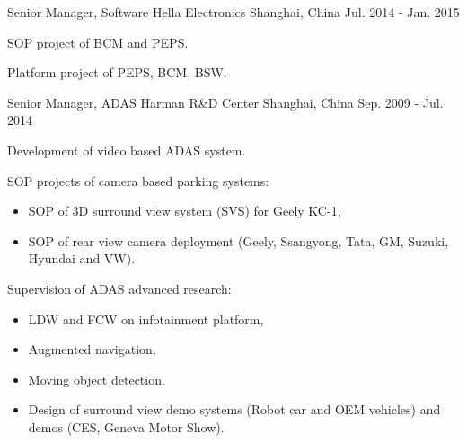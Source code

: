 \documentclass[../cv.tex]{subfiles}
\begin{document}
\begin{cventries}
  \cventry
    {Senior Manager, Software} %
    {Hella Electronics} %
    {Shanghai, China} %
    {Jul. 2014 - Jan. 2015} %
    {
      \begin{cvitems}
        \item SOP project of BCM and PEPS.
        \item Platform project of PEPS, BCM, BSW.
      \end{cvitems}
    }

  \cventry
    {Senior Manager, ADAS} %
    {Harman R\&D Center} %
    {Shanghai, China} %
    {Sep. 2009 - Jul. 2014} %
    {
      \begin{cvitems}
        \item Development of video based ADAS system.
        \item SOP projects of camera based parking systems:
          \begin{itemize}
            \item SOP of 3D surround view system (SVS) for Geely KC-1,
            \item SOP of rear view camera deployment (Geely, Ssangyong, Tata, GM, Suzuki, Hyundai and VW).
           \end{itemize}
        \item Supervision of ADAS advanced research:
          \begin{itemize}
            \item LDW and FCW on infotainment platform,
            \item Augmented navigation,
            \item Moving object detection.
            \item Design of surround view demo systems (Robot car and OEM vehicles) and demos (CES, Geneva Motor Show).
          \end{itemize}
      \end{cvitems}
    }
\end{cventries}
\end{document}
